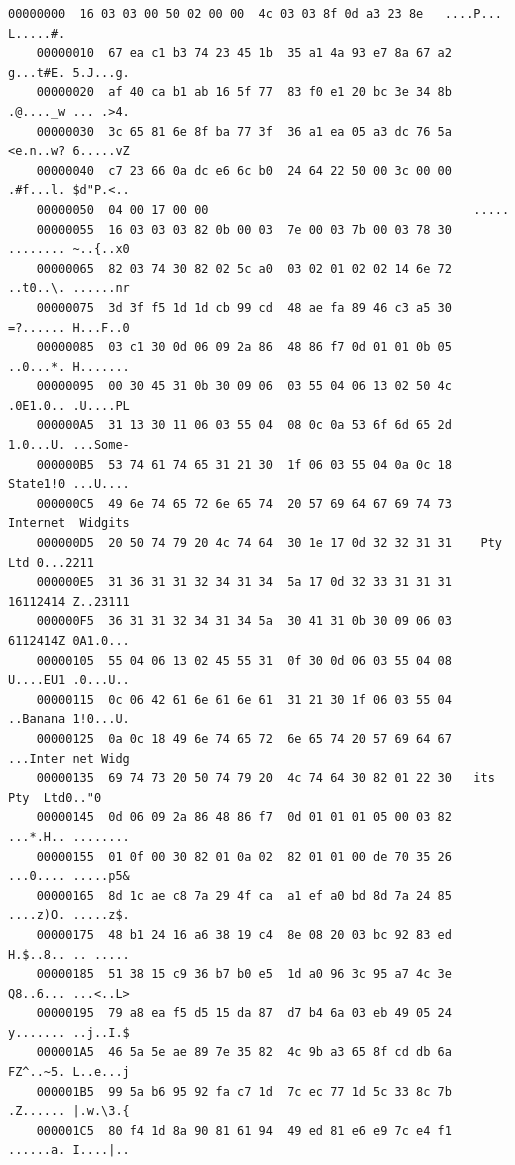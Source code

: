 \documentclass[12pt,twoside,a4]{mwbk}
\theoremstyle{definition}
\begin{document}
\begin{lstlisting}[keywordstyle=\color{Black},
  commentstyle=\color{Black},
  stringstyle=\color{Black},
  identifierstyle=\color{Black}]
    00000000  16 03 03 00 50 02 00 00  4c 03 03 8f 0d a3 23 8e   ....P... L.....#.
    00000010  67 ea c1 b3 74 23 45 1b  35 a1 4a 93 e7 8a 67 a2   g...t#E. 5.J...g.
    00000020  af 40 ca b1 ab 16 5f 77  83 f0 e1 20 bc 3e 34 8b   .@...._w ... .>4.
    00000030  3c 65 81 6e 8f ba 77 3f  36 a1 ea 05 a3 dc 76 5a   <e.n..w? 6.....vZ
    00000040  c7 23 66 0a dc e6 6c b0  24 64 22 50 00 3c 00 00   .#f...l. $d"P.<..
    00000050  04 00 17 00 00                                     .....
    00000055  16 03 03 03 82 0b 00 03  7e 00 03 7b 00 03 78 30   ........ ~..{..x0
    00000065  82 03 74 30 82 02 5c a0  03 02 01 02 02 14 6e 72   ..t0..\. ......nr
    00000075  3d 3f f5 1d 1d cb 99 cd  48 ae fa 89 46 c3 a5 30   =?...... H...F..0
    00000085  03 c1 30 0d 06 09 2a 86  48 86 f7 0d 01 01 0b 05   ..0...*. H.......
    00000095  00 30 45 31 0b 30 09 06  03 55 04 06 13 02 50 4c   .0E1.0.. .U....PL
    000000A5  31 13 30 11 06 03 55 04  08 0c 0a 53 6f 6d 65 2d   1.0...U. ...Some-
    000000B5  53 74 61 74 65 31 21 30  1f 06 03 55 04 0a 0c 18   State1!0 ...U....
    000000C5  49 6e 74 65 72 6e 65 74  20 57 69 64 67 69 74 73   Internet  Widgits
    000000D5  20 50 74 79 20 4c 74 64  30 1e 17 0d 32 32 31 31    Pty Ltd 0...2211
    000000E5  31 36 31 31 32 34 31 34  5a 17 0d 32 33 31 31 31   16112414 Z..23111
    000000F5  36 31 31 32 34 31 34 5a  30 41 31 0b 30 09 06 03   6112414Z 0A1.0...
    00000105  55 04 06 13 02 45 55 31  0f 30 0d 06 03 55 04 08   U....EU1 .0...U..
    00000115  0c 06 42 61 6e 61 6e 61  31 21 30 1f 06 03 55 04   ..Banana 1!0...U.
    00000125  0a 0c 18 49 6e 74 65 72  6e 65 74 20 57 69 64 67   ...Inter net Widg
    00000135  69 74 73 20 50 74 79 20  4c 74 64 30 82 01 22 30   its Pty  Ltd0.."0
    00000145  0d 06 09 2a 86 48 86 f7  0d 01 01 01 05 00 03 82   ...*.H.. ........
    00000155  01 0f 00 30 82 01 0a 02  82 01 01 00 de 70 35 26   ...0.... .....p5&
    00000165  8d 1c ae c8 7a 29 4f ca  a1 ef a0 bd 8d 7a 24 85   ....z)O. .....z$.
    00000175  48 b1 24 16 a6 38 19 c4  8e 08 20 03 bc 92 83 ed   H.$..8.. .. .....
    00000185  51 38 15 c9 36 b7 b0 e5  1d a0 96 3c 95 a7 4c 3e   Q8..6... ...<..L>
    00000195  79 a8 ea f5 d5 15 da 87  d7 b4 6a 03 eb 49 05 24   y....... ..j..I.$
    000001A5  46 5a 5e ae 89 7e 35 82  4c 9b a3 65 8f cd db 6a   FZ^..~5. L..e...j
    000001B5  99 5a b6 95 92 fa c7 1d  7c ec 77 1d 5c 33 8c 7b   .Z...... |.w.\3.{
    000001C5  80 f4 1d 8a 90 81 61 94  49 ed 81 e6 e9 7c e4 f1   ......a. I....|..

\end{lstlisting}
\end{document}
